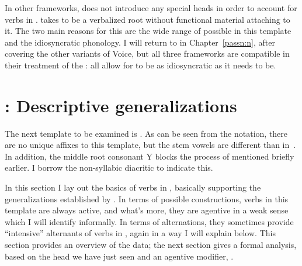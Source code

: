 \begin{exe}
\begin{xlist}
\begin{exe}
\begin{xlist}
\begin{exe}
\begin{xlist}
\begin{exe}
\begin{exe}
\begin{xlist}
\begin{exe}
\begin{xlist}
\begin{exe}
\begin{xlist}
\begin{exe}
\begin{xlist}
\begin{exe}
\begin{xlist}
\begin{exe}
\begin{xlist}
\begin{exe}
\begin{xlist}
\begin{exe}
\begin{xlist}
\begin{exe}
\begin{xlist}
\begin{exe}
\begin{xlist}
\begin{exe}
\begin{xlist}
\begin{exe}
\begin{xlist}
\begin{exe}
\begin{exe}
\begin{xlist}
\begin{exe}
\begin{xlist}
\begin{exe}
\begin{xlist}
\begin{exe}
\begin{xlist}
{\begin{exe}
\begin{xlist}
\begin{exe}
\begin{xlist}
\begin{exe}
\begin{xlist}
\begin{exe}
\begin{xlist}
\begin{xlist}
\begin{xlist}
\begin{exe}
\begin{xlist}
\begin{xlist}
\begin{xlist}
\begin{exe}
\begin{exe}
\begin{xlist}
In other frameworks, \cite{doron03} does not introduce any special heads in order to account for verbs in {\tkal}. \cite{borer13oup,borer15roots} takes {\tkal} to be a verbalized root without functional material attaching to it. The two main reasons for this are the wide range of  possible in this template and the idiosyncratic phonology. I will return to  in Chapter~\ref{passn:n}, after covering the other variants of Voice, but all three frameworks are compatible in their treatment of the {\tkal}: all allow for {\tkal} to be as idiosyncratic as it needs to be.

\section{\tpie: Descriptive generalizations} \label{voice:tpie}
The next template to be examined is {\tpie}. As can be seen from the notation, there are no unique affixes to this template, but the stem vowels are different than in~{\tkal}. In addition, the middle root consonant Y blocks the process of  mentioned briefly earlier. I borrow the non-syllabic diacritic  to indicate this.

In this section I lay out the basics of verbs in {\tpie}, basically supporting the generalizations established by \cite{doron03}. In terms of possible constructions, verbs in this template are always active, and what's more, they are agentive in a weak sense which I will identify informally. In terms of alternations, they sometimes provide ``intensive'' alternants of verbs in {\tkal}, again in a way I will explain below. This section provides an overview of the data; the next section gives a formal analysis, based on the head  we have just seen and an agentive modifier, {\va}.


\end{xlist}
\end{exe}
\end{exe}
\end{xlist}
\end{xlist}
\end{xlist}
\end{exe}
\end{xlist}
\end{xlist}
\end{xlist}
\end{exe}
\end{xlist}
\end{exe}
\end{xlist}
\end{exe}
\end{xlist}
\end{exe}}
\end{xlist}
\end{exe}
\end{xlist}
\end{exe}
\end{xlist}
\end{exe}
\end{xlist}
\end{exe}
\end{exe}
\end{xlist}
\end{exe}
\end{xlist}
\end{exe}
\end{xlist}
\end{exe}
\end{xlist}
\end{exe}
\end{xlist}
\end{exe}
\end{xlist}
\end{exe}
\end{xlist}
\end{exe}
\end{xlist}
\end{exe}
\end{xlist}
\end{exe}
\end{xlist}
\end{exe}
\end{xlist}
\end{exe}
\end{xlist}
\end{exe}
\end{exe}
\end{xlist}
\end{exe}
\end{xlist}
\end{exe}
\end{xlist}
\end{exe}

